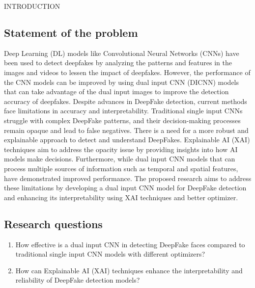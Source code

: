 \begin{section}[]{\uppercase{Introduction}}
    \subsection{Statement of the problem}
    Deep Learning (DL) models like Convolutional Neural Networks (CNNs) have been used to detect deepfakes by analyzing the patterns and features in the images and videos to lessen the impact of deepfakes. \cite{Tolosana2020}
    However, the performance of the CNN models can be improved by using dual input CNN (DICNN) models that can take advantage of the dual input images to improve the detection accuracy of deepfakes. \cite{Bhandari2023}
    Despite advances in DeepFake detection, current methods face limitations in accuracy and interpretability. Traditional single input CNNs struggle with complex DeepFake patterns, and their decision-making processes remain opaque and lead to false negatives. There is a need for a more robust and explainable approach to detect and understand DeepFakes. Explainable AI (XAI) techniques aim to address the opacity issue by providing insights into how AI models make decisions. Furthermore, while dual input CNN models that can process multiple sources of information such as temporal and spatial features, have demonstrated improved performance.
    The proposed research aims to address these limitations by developing a dual input CNN model for DeepFake detection and enhancing its interpretability using XAI techniques and better optimizer.

    \subsection{Research questions}

    \begin{enumerate}[label=\bf{Q\arabic*}]
        \item How effective is a dual input CNN in detecting DeepFake faces compared to traditional single input CNN models with different optimizers?
        \item How can Explainable AI (XAI) techniques enhance the interpretability and reliability of DeepFake detection models?
    \end{enumerate}


\end{section}
